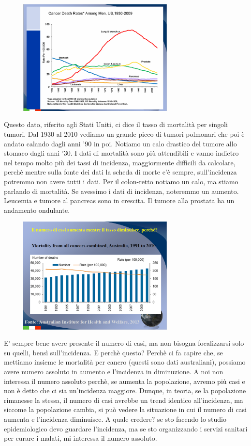 \begin{figure}[!ht]
\centering
	\includegraphics[width=0.7\textwidth]{03/image6.png}
\end{figure}

Questo dato, riferito agli Stati Uniti, ci dice il tasso di mortalità
per singoli tumori. Dal 1930 al 2010 vediamo un grande picco di tumori
polmonari che poi è andato calando dagli anni '90 in poi. Notiamo un
calo drastico del tumore allo stomaco dagli anni '30. I dati di
mortalità sono più attendibili e vanno indietro nel tempo molto più dei
tassi di incidenza, maggiormente difficili da calcolare, perchè mentre
sulla fonte dei dati la scheda di morte c'è sempre, sull'incidenza
potremmo non avere tutti i dati. Per il colon-retto notiamo un calo, ma
stiamo parlando di mortalità. Se avessimo i dati di incidenza, noteremmo
un aumento. Leucemia e tumore al pancreas sono in crescita. Il tumore
alla prostata ha un andamento ondulante.
\begin{figure}[!ht]
\centering
	\includegraphics[width=0.7\textwidth]{03/image7.png}
\end{figure}
E' sempre bene avere presente il numero di casi, ma non bisogna
focalizzarsi solo su quelli, bensì sull'incidenza. E perchè questo?
Perchè ci fa capire che, se mettiamo insieme le mortalità per cancro
(questi sono dati australiani), possiamo avere numero assoluto in
aumento e l'incidenza in diminuzione. A noi non interessa il numero
assoluto perchè, se aumenta la popolazione, avremo più casi e non è
detto che ci sia un'incidenza maggiore. Dunque, in teoria, se la
popolazione rimanesse la stessa, il numero di casi avrebbe un trend
identico all'incidenza, ma siccome la popolazione cambia, si può vedere
la situazione in cui il numero di casi aumenta e l'incidenza diminuisce.
A quale credere? se sto facendo lo studio epidemiologico devo guardare
l'incidenza, ma se sto organizzando i servizi sanitari per curare i
malati, mi interessa il numero assoluto.

